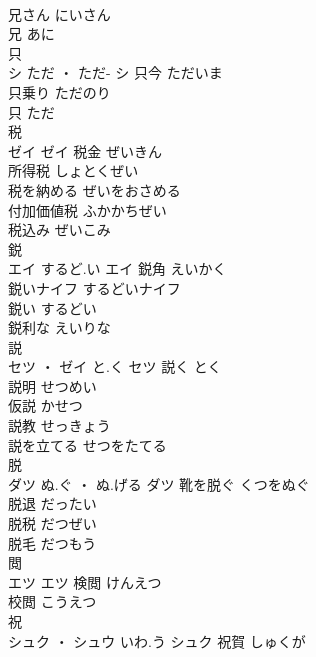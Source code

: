 \documentclass[8pt]{extreport}
\begin{document}
\begin{CJK}{UTF8}{min}
\\	兄さん	にいさん	
\\	兄	あに	
\\	只	
\\	シ	ただ ・ ただ-	シ	只今	ただいま	
\\	只乗り	ただのり	
\\	只	ただ	
\\	税	
\\	ゼイ		ゼイ	税金	ぜいきん	
\\	所得税	しょとくぜい	
\\	税を納める	ぜいをおさめる	
\\	付加価値税	ふかかちぜい	
\\	税込み	ぜいこみ	
\\	鋭	
\\	エイ	するど.い	エイ	鋭角	えいかく	
\\	鋭いナイフ	するどいナイフ	
\\	鋭い	するどい	
\\	鋭利な	えいりな	
\\	説	
\\	セツ ・ ゼイ	と.く	セツ	説く	とく	
\\	説明	せつめい	
\\	仮説	かせつ	
\\	説教	せっきょう	
\\	説を立てる	せつをたてる	
\\	脱	
\\	ダツ	ぬ.ぐ ・ ぬ.げる	ダツ	靴を脱ぐ	くつをぬぐ	
\\	脱退	だったい	
\\	脱税	だつぜい	
\\	脱毛	だつもう	
\\	閲	
\\	エツ		エツ	検閲	けんえつ	
\\	校閲	こうえつ	
\\	祝	
\\	シュク ・ シュウ	いわ.う	シュク													祝賀	しゅくが	
\end{CJK}
\end{document}

